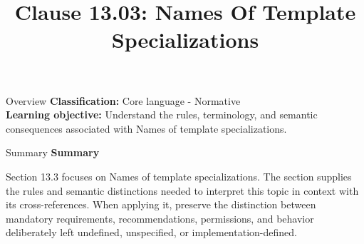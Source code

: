 \documentclass[10pt,letterpaper]{article}
\title{Clause 13.03: Names Of Template Specializations}
\author{}
\date{}
\begin{document}
\maketitle
\begin{CornellOverviewBox}{Overview}
\textbf{Classification:} Core language - Normative\\[2pt]
\textbf{Learning objective:} Understand the rules, terminology, and semantic consequences associated with Names of template specializations.
\end{CornellOverviewBox}\begin{CornellSummaryBox}{Summary}
{\sffamily\bfseries\color{Accent} Summary}\par\vspace{3pt}Section 13.3 focuses on Names of template specializations. The section supplies the rules and semantic distinctions needed to interpret this topic in context with its cross-references. When applying it, preserve the distinction between mandatory requirements, recommendations, permissions, and behavior deliberately left undefined, unspecified, or implementation-defined.
\end{CornellSummaryBox}
\end{document}
